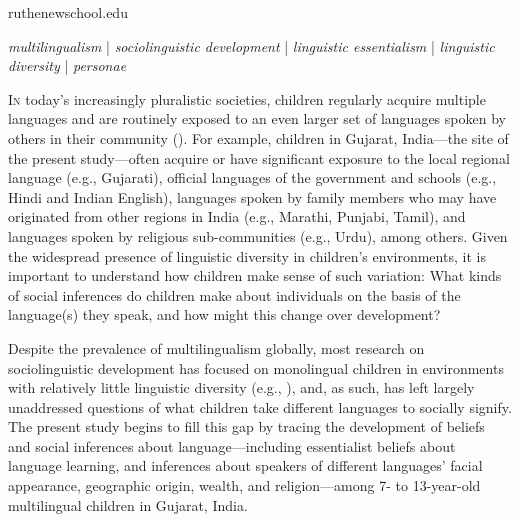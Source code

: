 \documentclass{foushee-adapted-preprint}
\begin{document}
\begin{corrauthor}
ruthe\at newschool.edu
\end{corrauthor}
\begin{keywords}
\noindent
\textit{multilingualism} | \textit{sociolinguistic development} | \textit{linguistic essentialism} | \textit{ linguistic diversity} | \textit{personae}
\end{keywords}
\maketitle
\vspace{5pt}
\lettrine{I}n today's increasingly pluralistic societies, children regularly acquire multiple languages and are routinely exposed to an even larger set of languages spoken by others in their community (\cite{lin2020research, grosjean2010bilingual}). For example, children in Gujarat, India---the site of the present study---often acquire or have significant exposure to the local regional language (e.g., Gujarati), official languages of the government and schools (e.g., Hindi and Indian English), languages spoken by family members who may have originated from other regions in India (e.g., Marathi, Punjabi, Tamil), and languages spoken by religious sub-communities (e.g., Urdu), among others. Given the widespread presence of linguistic diversity in children's environments, it is important to understand how children make sense of such variation: What kinds of social inferences do children make about individuals on the basis of the language(s) they speak, and how might this change over development? 

Despite the prevalence of multilingualism globally, most research on sociolinguistic development has focused on monolingual children in environments with relatively little linguistic diversity (e.g., \cite{moon1993two, kinzler2007native, shutts2009social, buttelmann2013selective, weatherhead2019preschoolers}), and, as such, has left largely unaddressed questions of what children take different languages to socially signify. The present study begins to fill this gap by tracing the development of beliefs and social inferences about language---including essentialist beliefs about language learning, and inferences about speakers of different languages' facial appearance, geographic origin, wealth, and religion---among 7- to 13-year-old multilingual children in Gujarat, India.
\end{document}
